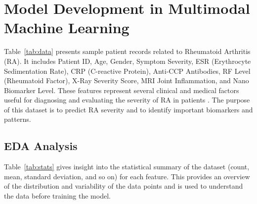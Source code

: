 \documentclass[10pt]{NSP1}
\begin{document}
	\section{Model Development in Multimodal Machine Learning}
	Table~\ref{tab:data} presents sample patient records related to Rheumatoid Arthritis (RA). It includes Patient ID, Age, Gender, Symptom Severity, ESR (Erythrocyte Sedimentation Rate), CRP (C-reactive Protein), Anti-CCP Antibodies, RF Level (Rheumatoid Factor), X-Ray Severity Score, MRI Joint Inflammation, and Nano Biomarker Level. These features represent several clinical and medical factors useful for diagnosing and evaluating the severity of RA in patients \cite{khan2022improved}. The purpose of this dataset is to predict RA severity and to identify important biomarkers and patterns.
	
	\begin{table}[H]
		\centering
		\caption{Sample Patient Data (Data Description)}
		\renewcommand{\arraystretch}{1.2}
		\label{tab:data}
	\end{table}
	
	\subsection{EDA Analysis}
	Table~\ref{tab:stats} gives insight into the statistical summary of the dataset (count, mean, standard deviation, and so on) for each feature. This provides an overview of the distribution and variability of the data points and is used to understand the data before training the model.
	
\end{document}
